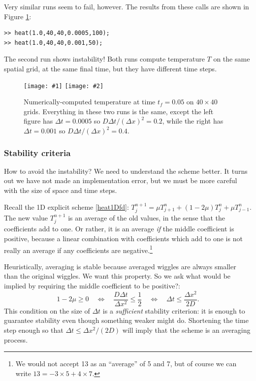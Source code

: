 \documentclass[titlepage,letterpaper,final,12pt]{scrartcl}
\newcommand{\minput}[1]{
\bigskip
\begin{quote}
\bigskip
\VerbatimInput[frame=single,framesep=3mm,label=\fbox{\normalsize \textsl{\,#1.m\,}},fontfamily=courier,fontsize=\scriptsize]{../mfiles/#1.slim.m}
\bigskip
\end{quote}
}
\newcommand{\twofigsizes}[5]{
\begin{figure}[ht]
\centering
\texttt{[image: \#1]} \quad
\texttt{[image: \#2]}
\caption{#3}
\label{fig:#1}
\end{figure}}
\newcommand{\twofig}[3]{\twofigsizes{#1}{#2}{#3}{2.5in}{2.5in}}
\begin{document}
\minput{heat}

Very similar runs seem to fail, however.  The results from these calls are shown in Figure \ref{fig:stability}:
\begin{Verbatim}
>> heat(1.0,40,40,0.0005,100);
>> heat(1.0,40,40,0.001,50);
\end{Verbatim}
The second run shows instability!  Both runs compute temperature $T$ on the same spatial grid, at the same final time, but they have different time steps.

\twofig{stability}{instability}{Numerically-computed temperature at time $t_f=0.05$ on $40\times 40$ grids.  Everything in these two runs is the same, except the left figure has $\Delta t=0.0005$ so $D\Delta t/(\Delta x)^2= 0.2$, while the right has $\Delta t=0.001$ so $D\Delta t/(\Delta x)^2= 0.4$.}


\subsubsection*{Stability criteria}

How to avoid the instability?  We need to understand the scheme better.  It turns out we have not made an implementation error, but we must be more careful with the size of space and time steps.

Recall the 1D explicit scheme \eqref{heat1Dfd}: $T_j^{n+1} = \mu T_{j+1}^n + (1 - 2 \mu) T_j^n + \mu T_{j-1}^n$.  The new value $T_j^{n+1}$ is an average of the old values, in the sense that the coefficients add to one.  Or rather, it is an average \emph{if} the middle coefficient is positive, because a linear combination with coefficients which add to one is not really an average if any coefficients are negative.\footnote{We would not accept 13 as an ``average'' of 5 and 7, but of course we can write $13 = -3 \times 5 + 4 \times 7$.}

Heuristically, averaging is stable because averaged wiggles are always smaller than the original wiggles.  We want this property.  So we ask what would be implied by requiring the middle coefficient to be positive?:
	$$1 - 2 \mu \ge 0 \quad \iff \quad \frac{D\Delta t}{\Delta x^2} \le \frac{1}{2} \quad \iff \quad \Delta t \le \frac{\Delta x^2}{2 D}.$$
This condition on the size of $\Delta t$ is a \emph{sufficient} stability criterion: it is enough to guarantee stability even though something weaker might do.  Shortening the time step enough so that $\Delta t \le \Delta x^2/(2 D)$ will imply that the scheme is an averaging process.
\end{document}
